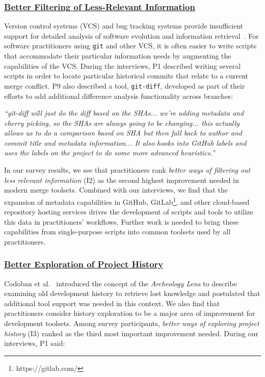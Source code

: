 \subsubsection{\underline{Better Filtering of Less-Relevant Information}}
Version control systems (VCS) and bug tracking systems provide insufficient support for detailed analysis of software evolution and information retrieval~\cite{fischer2003release_history}.
For software practitioners using \texttt{git} and other VCS, it is often easier to write scripts that accommodate their particular information needs by augmenting the capabilities of the VCS.
During the interviews, P1 described writing several scripts in order to locate particular historical commits that relate to a current merge conflict.
P9 also described a tool, \texttt{git-diff}, developed as part of their efforts to add additional difference analysis functionality across branches:
\begin{displayquote}
\textit{``git-diff will just do the diff based on the SHAs... we're adding metadata and cherry picking, so the SHAs are always going to be changing... this actually allows us to do a comparison based on SHA but then fall back to author and commit title and metadata information... It also hooks into GitHub labels and uses the labels on the project to do some more advanced heuristics.''}
\end{displayquote}
In our survey results, we see that practitioners rank \textit{better ways of filtering out less relevant information} (I2) as the second highest improvement needed in modern merge toolsets.
Combined with our interviews, we find that the expansion of metadata capabilities in GitHub, GitLab\footnote{https://gitlab.com/}, and other cloud-based repository hosting services drives the development of scripts and tools to utilize this data in practitioners' workflows.
Further work is needed to bring these capabilities from single-purpose scripts into common toolsets used by all practitioners.

\subsubsection{\underline{Better Exploration of Project History}}
Codoban et al.~\cite{mihai_lenses} introduced the concept of the \textit{Archeology Lens} to describe examining old development history to retrieve lost knowledge and postulated that additional tool support was needed in this context.
We also find that practitioners consider history exploration to be a major area of improvement for development toolsets.
Among survey participants, \textit{better ways of exploring project history} (I3) ranked as the third most important improvement needed.
During our interviews, P1 said: 

